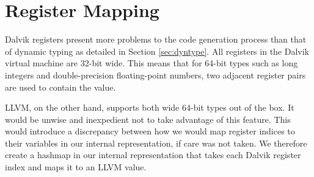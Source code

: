 \section{Register Mapping}
\label{sec:regmap}

Dalvik registers present more problems to the code generation process than that of dynamic typing as detailed in Section \ref{sec:dyntype}. All registers in the Dalvik virtual machine are 32-bit wide. This means that for 64-bit types such as long integers and double-precision floating-point numbers, two adjacent register pairs are used to contain the value.

LLVM, on the other hand, supports both wide 64-bit types out of the box. It would be unwise and inexpedient not to take advantage of this feature. This would introduce a discrepancy between how we would map register indices to their variables in our internal representation, if care was not taken. We therefore create a hashmap in our internal representation that takes each Dalvik register index and maps it to an LLVM value.
